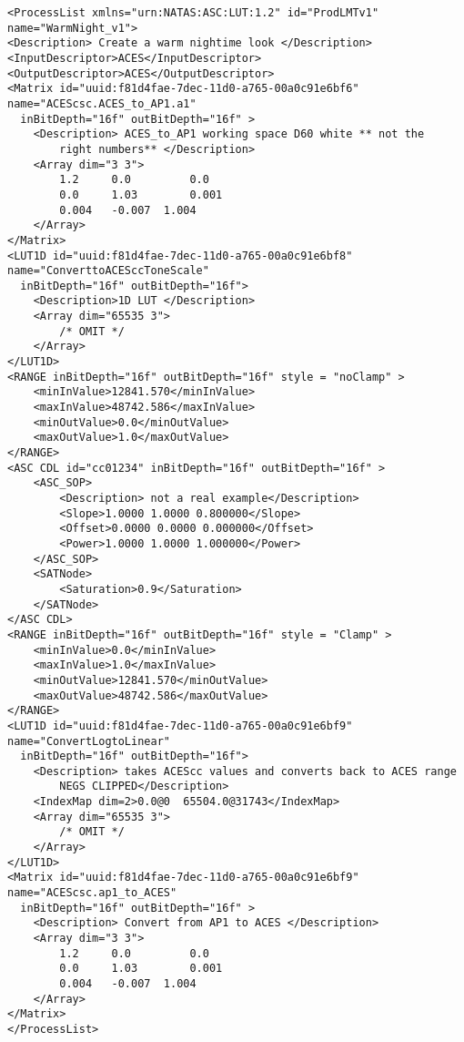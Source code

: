 \begin{lstlisting}
<ProcessList xmlns="urn:NATAS:ASC:LUT:1.2" id="ProdLMTv1" name="WarmNight_v1">
<Description> Create a warm nightime look </Description>
<InputDescriptor>ACES</InputDescriptor>
<OutputDescriptor>ACES</OutputDescriptor>
<Matrix id="uuid:f81d4fae-7dec-11d0-a765-00a0c91e6bf6" name="ACEScsc.ACES_to_AP1.a1"
  inBitDepth="16f" outBitDepth="16f" >
	<Description> ACES_to_AP1 working space D60 white ** not the 
	    right numbers** </Description>
	<Array dim="3 3">
		1.2		0.0			0.0
		0.0		1.03		0.001
		0.004	-0.007	1.004
	</Array>
</Matrix>
<LUT1D id="uuid:f81d4fae-7dec-11d0-a765-00a0c91e6bf8" name="ConverttoACESccToneScale" 
  inBitDepth="16f" outBitDepth="16f">
	<Description>1D LUT </Description>
	<Array dim="65535 3">
		/* OMIT */
	</Array>
</LUT1D>
<RANGE inBitDepth="16f" outBitDepth="16f" style = "noClamp" >
	<minInValue>12841.570</minInValue>
	<maxInValue>48742.586</maxInValue>
	<minOutValue>0.0</minOutValue>
	<maxOutValue>1.0</maxOutValue>
</RANGE>
<ASC CDL id="cc01234" inBitDepth="16f" outBitDepth="16f" >
	<ASC_SOP>
		<Description> not a real example</Description>
		<Slope>1.0000 1.0000 0.800000</Slope>
		<Offset>0.0000 0.0000 0.000000</Offset>
		<Power>1.0000 1.0000 1.000000</Power>
	</ASC_SOP>
	<SATNode>
		<Saturation>0.9</Saturation>
	</SATNode>
</ASC CDL>
<RANGE inBitDepth="16f" outBitDepth="16f" style = "Clamp" >
	<minInValue>0.0</minInValue>
	<maxInValue>1.0</maxInValue>
	<minOutValue>12841.570</minOutValue>
	<maxOutValue>48742.586</maxOutValue>
</RANGE>
<LUT1D id="uuid:f81d4fae-7dec-11d0-a765-00a0c91e6bf9" name="ConvertLogtoLinear"
  inBitDepth="16f" outBitDepth="16f">
	<Description> takes ACEScc values and converts back to ACES range 
	    NEGS CLIPPED</Description>
	<IndexMap dim=2>0.0@0  65504.0@31743</IndexMap>
	<Array dim="65535 3">
		/* OMIT */
	</Array>
</LUT1D>
<Matrix id="uuid:f81d4fae-7dec-11d0-a765-00a0c91e6bf9" name="ACEScsc.ap1_to_ACES"
  inBitDepth="16f" outBitDepth="16f" >
	<Description> Convert from AP1 to ACES </Description>
	<Array dim="3 3">
		1.2		0.0			0.0
		0.0		1.03		0.001
		0.004	-0.007	1.004
	</Array>
</Matrix>
</ProcessList>
\end{lstlisting}
